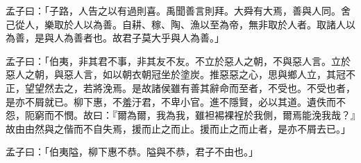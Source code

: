 \begin{pinyinscope}
孟子曰：「子路，人告之以有過則喜。禹聞善言則拜。大舜有大焉，善與人同。舍己從人，樂取於人以為善。自耕、稼、陶、漁以至為帝，無非取於人者。取諸人以為善，是與人為善者也。故君子莫大乎與人為善。」

孟子曰：「伯夷，非其君不事，非其友不友。不立於惡人之朝，不與惡人言。立於惡人之朝，與惡人言，如以朝衣朝冠坐於塗炭。推惡惡之心，思與鄉人立，其冠不正，望望然去之，若將浼焉。是故諸侯雖有善其辭命而至者，不受也。不受也者，是亦不屑就已。柳下惠，不羞汙君，不卑小官。進不隱賢，必以其道。遺佚而不怨，阨窮而不憫。故曰：『爾為爾，我為我，雖袒裼裸裎於我側，爾焉能浼我哉？』故由由然與之偕而不自失焉，援而止之而止。援而止之而止者，是亦不屑去已。」

孟子曰：「伯夷隘，柳下惠不恭。隘與不恭，君子不由也。」


\end{pinyinscope}